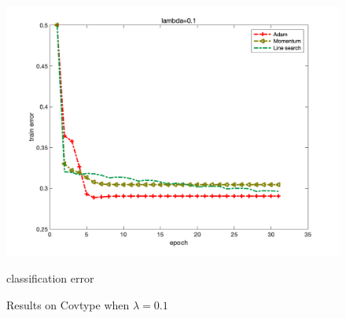 \documentclass{article}
\begin{document}
\begin{figure}[H]
\begin{minipage}{0.33\linewidth}
		\includegraphics[width=1\linewidth]{./fig/err_c3}
		\caption{classification error}
	\end{minipage}
	\caption*{Results on Covtype when $\lambda=0.1$}
\end{figure}
\end{document}
